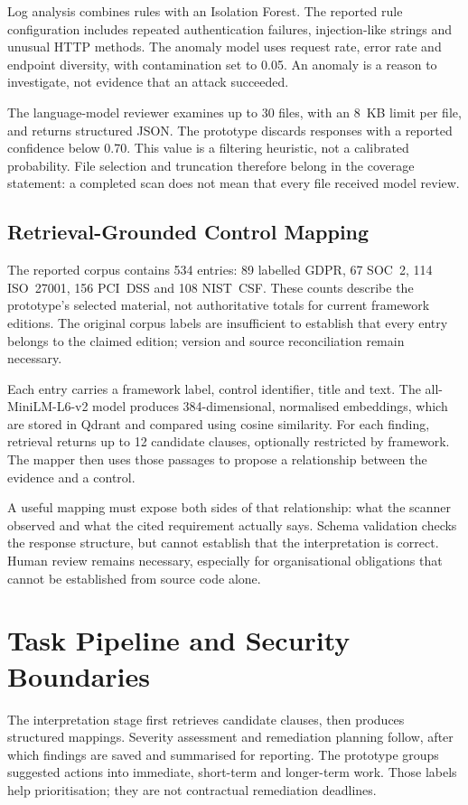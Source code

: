 \documentclass[conference,letterpaper]{IEEEtran}
\begin{document}
Log analysis combines rules with an Isolation Forest. The reported rule configuration includes repeated authentication failures, injection-like strings and unusual HTTP methods. The anomaly model uses request rate, error rate and endpoint diversity, with contamination set to 0.05. An anomaly is a reason to investigate, not evidence that an attack succeeded.

The language-model reviewer examines up to 30 files, with an 8~KB limit per file, and returns structured JSON. The prototype discards responses with a reported confidence below 0.70. This value is a filtering heuristic, not a calibrated probability. File selection and truncation therefore belong in the coverage statement: a completed scan does not mean that every file received model review.

\subsection{Retrieval-Grounded Control Mapping}
The reported corpus contains 534 entries: 89 labelled GDPR, 67 SOC~2, 114 ISO~27001, 156 PCI~DSS and 108 NIST~CSF. These counts describe the prototype's selected material, not authoritative totals for current framework editions. The original corpus labels are insufficient to establish that every entry belongs to the claimed edition; version and source reconciliation remain necessary.

Each entry carries a framework label, control identifier, title and text. The all-MiniLM-L6-v2 model produces 384-dimensional, normalised embeddings, which are stored in Qdrant and compared using cosine similarity. For each finding, retrieval returns up to 12 candidate clauses, optionally restricted by framework. The mapper then uses those passages to propose a relationship between the evidence and a control.

A useful mapping must expose both sides of that relationship: what the scanner observed and what the cited requirement actually says. Schema validation checks the response structure, but cannot establish that the interpretation is correct. Human review remains necessary, especially for organisational obligations that cannot be established from source code alone.

\section{Task Pipeline and Security Boundaries}
The interpretation stage first retrieves candidate clauses, then produces structured mappings. Severity assessment and remediation planning follow, after which findings are saved and summarised for reporting. The prototype groups suggested actions into immediate, short-term and longer-term work. Those labels help prioritisation; they are not contractual remediation deadlines.
\end{document}
